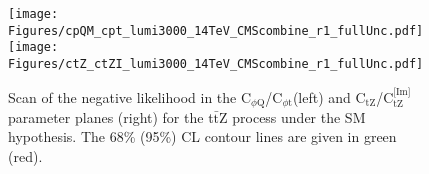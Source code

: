 \documentclass[letterpaper,11pt]{article}
\def\ttZ{t$\bar{\text{t}}$Z\xspace}
\def\ctZ{C$_\text{tZ}$\xspace}
\def\ctZI{C$_\text{tZ}^\text{[Im]}$\xspace}
\def\cpt{C$_{\phi \text{t}}$\xspace}
\def\cpQM{C$_{\phi \text{Q}}$\xspace}
\begin{document}


\begin{figure}[H]
  \centering
    \texttt{[image: Figures/cpQM\_cpt\_lumi3000\_14TeV\_CMScombine\_r1\_fullUnc.pdf]}
    \texttt{[image: Figures/ctZ\_ctZI\_lumi3000\_14TeV\_CMScombine\_r1\_fullUnc.pdf]}
  \caption{Scan of the negative likelihood in the \cpQM/\cpt (left) and \ctZ/\ctZI parameter planes (right) for the \ttZ process under the SM hypothesis.
           The 68\% (95\%) CL contour lines are given in green (red).
           }
  \label{fig:ttZ_nll}
\end{figure}


%

\end{document}
